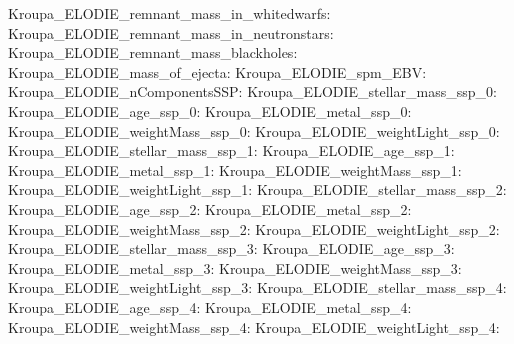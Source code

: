 Kroupa\_ELODIE\_remnant\_mass\_in\_whitedwarfs:  \newline 
Kroupa\_ELODIE\_remnant\_mass\_in\_neutronstars:  \newline 
Kroupa\_ELODIE\_remnant\_mass\_blackholes:  \newline 
Kroupa\_ELODIE\_mass\_of\_ejecta:  \newline 
Kroupa\_ELODIE\_spm\_EBV:  \newline 
Kroupa\_ELODIE\_nComponentsSSP:  \newline 
Kroupa\_ELODIE\_stellar\_mass\_ssp\_0:  \newline 
Kroupa\_ELODIE\_age\_ssp\_0:  \newline 
Kroupa\_ELODIE\_metal\_ssp\_0:  \newline 
Kroupa\_ELODIE\_weightMass\_ssp\_0:  \newline 
Kroupa\_ELODIE\_weightLight\_ssp\_0:  \newline 
Kroupa\_ELODIE\_stellar\_mass\_ssp\_1:  \newline 
Kroupa\_ELODIE\_age\_ssp\_1:  \newline 
Kroupa\_ELODIE\_metal\_ssp\_1:  \newline 
Kroupa\_ELODIE\_weightMass\_ssp\_1:  \newline 
Kroupa\_ELODIE\_weightLight\_ssp\_1:  \newline 
Kroupa\_ELODIE\_stellar\_mass\_ssp\_2:  \newline 
Kroupa\_ELODIE\_age\_ssp\_2:  \newline 
Kroupa\_ELODIE\_metal\_ssp\_2:  \newline 
Kroupa\_ELODIE\_weightMass\_ssp\_2:  \newline 
Kroupa\_ELODIE\_weightLight\_ssp\_2:  \newline 
Kroupa\_ELODIE\_stellar\_mass\_ssp\_3:  \newline 
Kroupa\_ELODIE\_age\_ssp\_3:  \newline 
Kroupa\_ELODIE\_metal\_ssp\_3:  \newline 
Kroupa\_ELODIE\_weightMass\_ssp\_3:  \newline 
Kroupa\_ELODIE\_weightLight\_ssp\_3:  \newline 
Kroupa\_ELODIE\_stellar\_mass\_ssp\_4:  \newline 
Kroupa\_ELODIE\_age\_ssp\_4:  \newline 
Kroupa\_ELODIE\_metal\_ssp\_4:  \newline 
Kroupa\_ELODIE\_weightMass\_ssp\_4:  \newline 
Kroupa\_ELODIE\_weightLight\_ssp\_4:  \newline 
